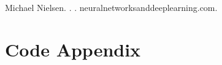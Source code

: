 \documentclass[11pt]{article}
\begin{document}
%
%

\begin{thebibliography}{}
		
	Michael Nielsen.
	.
	.
	\newblock neuralnetworksanddeeplearning.com.
		
\end{thebibliography}

\newpage
\onecolumn
\section*{Code Appendix}

\end{document}
